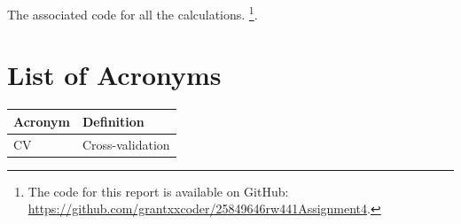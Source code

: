 \documentclass[conference]{IEEEtran}
\begin{document}
 The associated code for all the calculations.
\footnote{The code for this report is available on GitHub: \url{https://github.com/grantxxcoder/25849646rw441Assignment4}.}.
\appendix

\section*{List of Acronyms}
\begingroup
\setlength{\tabcolsep}{6pt}
\renewcommand{\arraystretch}{1.05}
\noindent\begin{tabular}{@{}p{}p{}@{}}
\textbf{Acronym} & \textbf{Definition} \\
\midrule
CV & Cross-validation \\
\end{tabular}
\endgroup



\end{document}
